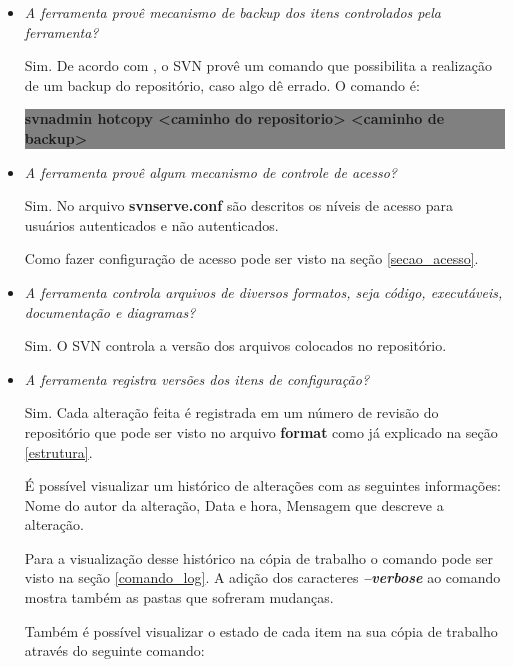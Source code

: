 \begin{itemize}
  \item \textit{A ferramenta provê mecanismo de backup dos itens controlados pela ferramenta?}

    Sim. De acordo com , o SVN provê um comando que possibilita a realização de um backup do repositório, caso algo dê errado. O comando é:

    \begin{centering}
    \colorbox{Gray}{
    \begin{minipage}{420px}
      \textbf{svnadmin hotcopy <caminho do repositorio> <caminho de backup>}
    \end{minipage}
    }

    \end{centering}

  \item \textit{A ferramenta provê algum mecanismo de controle de acesso?}

    Sim. No arquivo \textbf{svnserve.conf} são descritos os níveis de acesso para usuários autenticados e não autenticados.\cite{svn-book}

    Como fazer configuração de acesso pode ser visto na seção \ref{secao_acesso}.

  \item \textit{A ferramenta controla arquivos de diversos formatos, seja código, executáveis, documentação e diagramas?}

    Sim. O SVN controla a versão dos arquivos colocados no repositório.

  \item \textit{A ferramenta registra versões dos itens de configuração?}

    Sim. Cada alteração feita é registrada em um número de revisão do repositório que pode ser visto no arquivo \textbf{format} como já explicado na seção \ref{estrutura}.

    É possível visualizar um histórico de alterações com as seguintes informações: Nome do autor da alteração, Data e hora, Mensagem que descreve a alteração. \cite{svn-book}

    Para a visualização desse histórico na cópia de trabalho o comando pode ser visto na seção \ref{comando_log}. A adição dos caracteres \textbf{\textit{--verbose}} ao comando mostra também as pastas que sofreram mudanças.

    Também é possível visualizar o estado de cada item na sua cópia de trabalho através do seguinte comando: \cite{svn-book}


\end{itemize}
